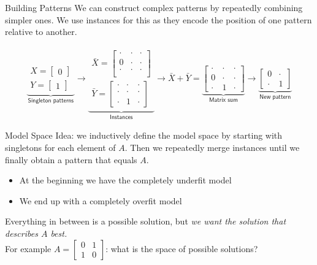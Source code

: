 \documentclass[11pt]{beamer}
\begin{document}
\begin{frame}{Building Patterns}
We can construct complex patterns by repeatedly combining simpler ones. We use instances for this as they encode the position of one pattern relative to another.

\begin{align*}
\underbrace{
\begin{matrix}
X = \begin{bmatrix}
0
\end{bmatrix} \\[1.0em]
Y = \begin{bmatrix}
1
\end{bmatrix}
\end{matrix}}_{\textsf{Singleton patterns}}
\longrightarrow
\underbrace{\begin{matrix}
\bar{X} = \begin{bmatrix}
\cdot  & \cdot & \cdot \\
0 & \cdot & \cdot \\
\cdot & \cdot & \cdot \\
\end{bmatrix} \\[1.0em]
\bar{Y} = \begin{bmatrix}
\cdot  & \cdot & \cdot \\
\cdot  & \cdot & \cdot \\
\cdot & 1 & \cdot
\end{bmatrix}
\end{matrix}}_{\textsf{Instances}}
\longrightarrow
\bar{X}+\bar{Y} =
\underbrace{
\begin{bmatrix}
\cdot  & \cdot & \cdot \\
0  & \cdot & \cdot \\
\cdot & 1 & \cdot
\end{bmatrix}}_{\textsf{Matrix sum}}
\longrightarrow
\underbrace{
\begin{bmatrix}
0  & \cdot \\
\cdot & 1 
\end{bmatrix}}_{\textsf{New pattern}}
\end{align*}
\end{frame}


\begin{frame}{Model Space}
Idea: we inductively define the model space by starting with singletons for each element of $A$. Then we repeatedly merge instances until we finally obtain a pattern that equals $A$.
\begin{itemize}
\item At the beginning we have the completely underfit model
\item We end up with a completely overfit model
\end{itemize}
\bigskip
Everything in between is a possible solution, but \emph{we want the solution that describes $A$ best.}\\[1em]
For example $A=\begin{bmatrix}0 & 1 \\ 1 & 0\end{bmatrix}$: what is the space of possible solutions?
\end{frame}
\end{document}
